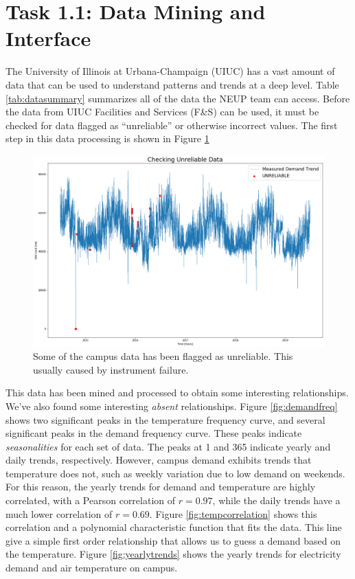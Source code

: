 \section{Task 1.1: Data Mining and Interface}

The University of Illinois at Urbana-Champaign (UIUC) has a vast amount of
data that can be used to understand patterns and trends at a deep level. Table \ref{tab:datasummary} summarizes all of the data the NEUP team can access.
Before the data from UIUC Facilities and Services (F\&S) can be used, it must
be checked for data flagged as ``unreliable'' or otherwise incorrect values.
The first step in this data processing is shown in Figure \ref{fig:unreliable}
\begin{figure}[H]
  \centering
  \includegraphics[width=\textwidth]{unreliable}
  \caption{Some of the campus data has been flagged as unreliable. This usually caused by instrument failure.}
  \label{fig:unreliable}
\end{figure}
This data has been mined and processed to obtain some interesting relationships.
We've also found some interesting \textit{absent} relationships. Figure \ref{fig:demandfreq} shows two significant peaks in the temperature frequency
curve, and several significant peaks in the demand frequency curve. These peaks
indicate \textit{seasonalities} for each set of data. The peaks at 1 and 365
indicate yearly and daily trends, respectively. However, campus demand exhibits
trends that temperature does not, such as weekly variation due to low demand
on weekends. For this reason, the yearly trends for demand and temperature are
highly correlated, with a Pearson correlation of $r=0.97$, while the daily trends have a much lower correlation of $r=0.69$. Figure \ref{fig:tempcorrelation} shows this correlation and a polynomial characteristic
function that fits the data. This line give a simple first order relationship
that allows us to guess a demand based on the temperature. Figure
\ref{fig:yearlytrends} shows the yearly trends for electricity demand and air
temperature on campus.


